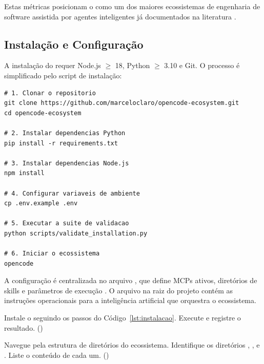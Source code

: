 Estas métricas posicionam o \opencodeeco{} como um dos maiores
ecossistemas de engenharia de software assistida por agentes inteligentes
já documentados na literatura \cite{laranjeira2026opencode,
wang2024survey, xi2023rise}.

\subsection{Instalação e Configuração}
\label{subsec:instalacao}

A instalação do \opencodeeco{} requer Node.js $\ge$ 18, Python $\ge$ 3.10
e Git. O processo é simplificado pelo script de instalação:

\begin{lstlisting}[style=bashstyle, caption={Instalacao do OpenCode Ecosystem},
                   label={lst:instalacao}]
# 1. Clonar o repositorio
git clone https://github.com/marceloclaro/opencode-ecosystem.git
cd opencode-ecosystem

# 2. Instalar dependencias Python
pip install -r requirements.txt

# 3. Instalar dependencias Node.js
npm install

# 4. Configurar variaveis de ambiente
cp .env.example .env

# 5. Executar a suite de validacao
python scripts/validate_installation.py

# 6. Iniciar o ecossistema
opencode
\end{lstlisting}

A configuração é centralizada no arquivo , que
define MCPs ativos, diretórios de skills e parâmetros de execução
\cite{opencode2026ecosystem}. O arquivo  na raiz do
projeto contém as instruções operacionais para a inteligência artificial
que orquestra o ecossistema.

\begin{exercicio}
Instale o \opencodeeco{} seguindo os passos do
Código~\ref{lst:instalacao}. Execute 
e registre o resultado. (\nivelzero)
\end{exercicio}

\begin{exercicio}
Navegue pela estrutura de diretórios do ecossistema. Identifique os
diretórios , ,  e
. Liste o conteúdo de cada um. (\nivelzero)
\end{exercicio}

